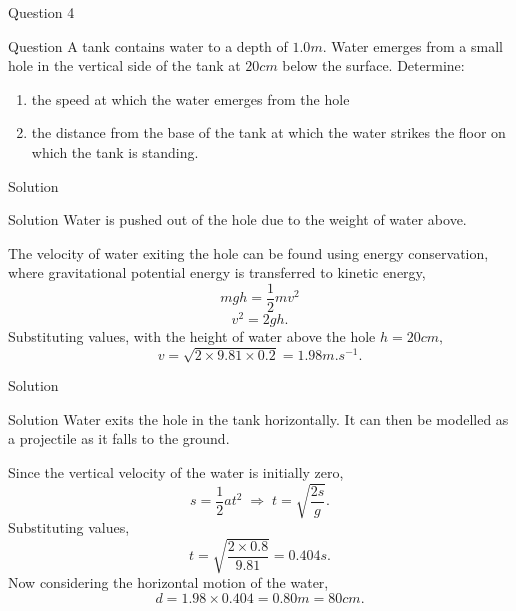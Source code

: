 \documentclass{beamer}
\begin{document}
    \begin{frame}{Question 4}
        \begin{block}{Question}
            A tank contains water to a depth of $1.0 \si{m}$. Water emerges from a small hole in the vertical side of the tank at $20 \si{cm}$ below the surface. Determine: 
            \begin{enumerate}
                \item the speed at which the water emerges from the hole 
                \item the distance from the base of the tank at which the water strikes the floor on which the tank is standing.
            \end{enumerate}
        \end{block}
    \end{frame}

    \begin{frame}{Solution}
        \begin{exampleblock}{Solution}
            Water is pushed out of the hole due to the weight of water above.\pause
            
            The velocity of water exiting the hole can be found using energy conservation, where gravitational potential energy is transferred to kinetic energy,
            \[mgh = \frac{1}{2}mv^2\]
            \[v^2 = 2gh.\] \pause
            Substituting values, with the height of water above the hole $h = 20\si{cm},$
            \[v = \sqrt{2 \times 9.81 \times 0.2} = 1.98 \si{m.s^{-1}}.\]
        \end{exampleblock}
    \end{frame}

    \begin{frame}{Solution}
        \begin{exampleblock}{Solution}
            Water exits the hole in the tank horizontally. It can then be modelled as a projectile as it falls to the ground. \pause
            
            Since the vertical velocity of the water is initially zero,
            \[s = \frac{1}{2} at^2 \;\Rightarrow\; t = \sqrt{\frac{2s}{g}}.\]\pause
            Substituting values,
            \[t = \sqrt{\frac{2 \times 0.8}{9.81}} = 0.404 \si{s}.\]\pause
            Now considering the horizontal motion of the water,
            \[d = 1.98 \times 0.404 = 0.80 \si{m} = 80 \si{cm}.\]
        \end{exampleblock}
    \end{frame}
\end{document}
